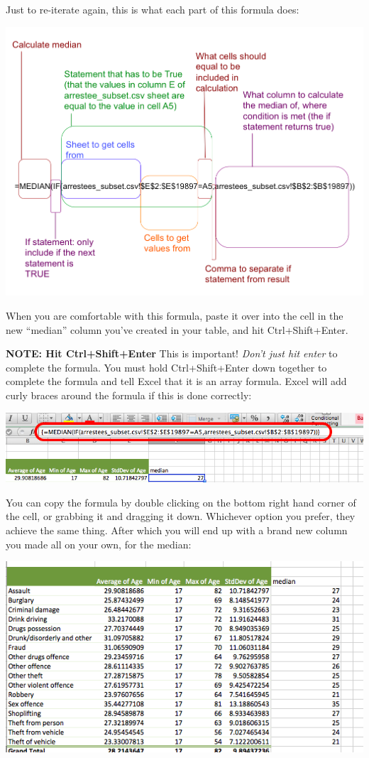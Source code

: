 \documentclass[
]{book}
\begin{document}
Just to re-iterate again, this is what each part of this formula does:

\includegraphics{imgs/med_excel_equ.png}

When you are comfortable with this formula, paste it over into the cell in the new ``median'' column you've created in your table, and hit Ctrl+Shift+Enter.

\textbf{NOTE: Hit Ctrl+Shift+Enter} This is important! \emph{Don't just hit enter} to complete the formula. You must hold Ctrl+Shift+Enter down together to complete the formula and tell Excel that it is an array formula. Excel will add curly braces around the formula if this is done correctly:

\includegraphics{imgs/curly_brack_formula.png}

You can copy the formula by double clicking on the bottom right hand corner of the cell, or grabbing it and dragging it down. Whichever option you prefer, they achieve the same thing. After which you will end up with a brand new column you made all on your own, for the median:

\includegraphics{imgs/final_table_with_median.png}
\end{document}
